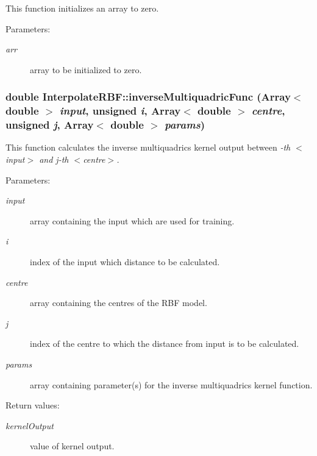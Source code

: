 This function initializes an array to zero. 

\begin{Desc}
\item[Parameters:]
\begin{description}
\item[{\em arr}]array to be initialized to zero.\end{description}
\end{Desc}
\subsubsection{\setlength{\rightskip}{0pt plus 5cm}double Interpolate\-RBF::inverse\-Multiquadric\-Func (Array$<$ double $>$ {\em input}, unsigned {\em i}, Array$<$ double $>$ {\em centre}, unsigned {\em j}, Array$<$ double $>$ {\em params})\hspace{0.3cm}{\tt  [static]}}\label{classInterpolateRBF_e5}


This function calculates the inverse multiquadrics kernel output between {\em -th $<$input$>$ and j-th $<$centre$>$. \/}

\begin{Desc}
\item[Parameters:]
\begin{description}
\item[{\em input}]array containing the input which are used for training. \item[{\em i}]index of the input which distance to be calculated. \item[{\em centre}]array containing the centres of the RBF model. \item[{\em j}]index of the centre to which the distance from input is to be calculated. \item[{\em params}]array containing parameter(s) for the inverse multiquadrics kernel function. \end{description}
\end{Desc}
\begin{Desc}
\item[Return values:]
\begin{description}
\item[{\em kernel\-Output}]value of kernel output.\end{description}
\end{Desc}
